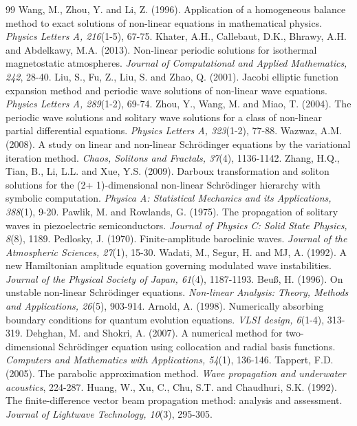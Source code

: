 \documentclass{article}
\numberwithin{equation}{section}
\begin{document}
\begin{thebibliography}{99}
Wang, M., Zhou, Y. and Li, Z. (1996). Application of a homogeneous balance method to exact solutions of non-linear equations in mathematical physics. \emph{Physics Letters A, 216}(1-5), 67-75.
Khater, A.H., Callebaut, D.K., Bhrawy, A.H. and Abdelkawy, M.A. (2013). Non-linear periodic solutions for isothermal magnetostatic atmospheres. \emph{Journal of Computational and Applied Mathematics, 242}, 28-40.
Liu, S., Fu, Z., Liu, S. and Zhao, Q. (2001). Jacobi elliptic function expansion method and periodic wave solutions of non-linear wave equations. \emph{Physics Letters A, 289}(1-2), 69-74.
Zhou, Y., Wang, M. and Miao, T. (2004). The periodic wave solutions and solitary wave solutions for a class of non-linear partial differential equations. \emph{Physics Letters A, 323}(1-2), 77-88.
Wazwaz, A.M. (2008). A study on linear and non-linear Schr\"{o}dinger equations by the variational iteration method.\emph{ Chaos, Solitons and Fractals, 37}(4), 1136-1142.
Zhang, H.Q., Tian, B., Li, L.L. and Xue, Y.S. (2009). Darboux transformation and soliton solutions for the (2+ 1)-dimensional non-linear Schrödinger hierarchy with symbolic computation. \emph{Physica A: Statistical Mechanics and its Applications, 388}(1), 9-20.
Pawlik, M. and Rowlands, G. (1975). The propagation of solitary waves in piezoelectric semiconductors. \emph{Journal of Physics C: Solid State Physics, 8}(8), 1189.
Pedlosky, J. (1970). Finite-amplitude baroclinic waves. \emph{Journal of the Atmospheric Sciences, 27}(1), 15-30.
Wadati, M., Segur, H. and MJ, A. (1992). A new Hamiltonian amplitude equation governing modulated wave instabilities. \emph{Journal of the Physical Society of Japan, 61}(4), 1187-1193.
Beuß, H. (1996). On unstable non-linear Schrödinger equations. \emph{Non-linear Analysis: Theory, Methods and Applications, 26}(5), 903-914.
Arnold, A. (1998). Numerically absorbing boundary conditions for quantum evolution equations. \emph{VLSI design, 6}(1-4), 313-319.
Dehghan, M. and Shokri, A. (2007). A numerical method for two-dimensional Schrödinger equation using collocation and radial basis functions. \emph{Computers and Mathematics with Applications, 54}(1), 136-146.
Tappert, F.D. (2005). The parabolic approximation method. \emph{Wave propagation and underwater acoustics}, 224-287.
Huang, W., Xu, C., Chu, S.T. and Chaudhuri, S.K. (1992). The finite-difference vector beam propagation method: analysis and assessment. \emph{Journal of Lightwave Technology, 10}(3), 295-305.

\end{thebibliography}
\end{document}
